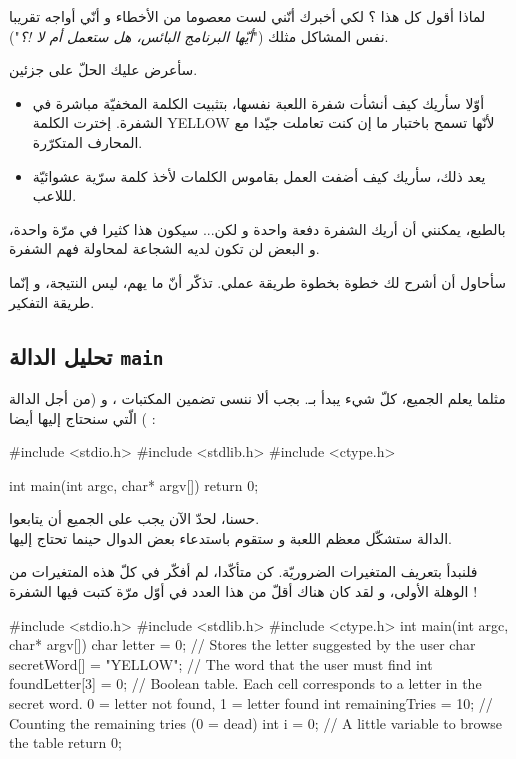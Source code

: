 لماذا أقول كل هذا ؟ لكي أخبرك أنّني لست معصوما من الأخطاء و أنّي أواجه تقريبا نفس المشاكل مثلك
("\textit{أيّها البرنامج البائس، هل ستعمل أم لا !؟}").

سأعرض عليك الحلّ على جزئين.
\begin{itemize}
  \item أوّلا سأريك كيف أنشأت شفرة اللعبة نفسها، بتثبيت الكلمة المخفيّة مباشرة في الشفرة. إخترت الكلمة
\textenglish{YELLOW}
لأنّها تسمح باختبار ما إن كنت تعاملت جيّدا مع المحارف المتكرّرة.
  \item يعد ذلك، سأريك كيف أضفت العمل بقاموس الكلمات لأخذ كلمة سرّية عشوائيّة لللاعب.
\end{itemize}

بالطبع، يمكنني أن أريك الشفرة دفعة واحدة و لكن... سيكون هذا كثيرا في مرّة واحدة، و البعض لن تكون لديه الشجاعة لمحاولة فهم الشفرة.

سأحاول أن أشرح لك خطوة بخطوة طريقة عملي. تذكّر أنّ ما يهم، ليس النتيجة، و إنّما طريقة التفكير.

\subsection{تحليل الدالة
\texttt{main}}
مثلما يعلم الجميع، كلّ شيء يبدأ بـ.
بجب ألا ننسى تضمين المكتبات
،
و
(من أجل الدالة
)
الّتي سنحتاج إليها أيضا :

\begin{Csource}
#include <stdio.h>
#include <stdlib.h>
#include <ctype.h>

int main(int argc, char* argv[])
{
  return 0;
}
\end{Csource}

حسنا، لحدّ الآن يجب على الجميع أن يتابعوا.\\
الدالة
ستشكّل معظم اللعبة و ستقوم باستدعاء بعض الدوال حينما تحتاج إليها.

فلنبدأ بتعريف المتغيرات الضروريّة. كن متأكّدا، لم أفكّر في كلّ هذه المتغيرات من الوهلة الأولى، و لقد كان هناك أقلّ من هذا العدد في أوّل مرّة كتبت فيها الشفرة !

\begin{Csource}
#include <stdio.h>
#include <stdlib.h>
#include <ctype.h>
int main(int argc, char* argv[])
{
  char letter = 0; // Stores the letter suggested by the user
  char secretWord[] = "YELLOW"; // The word that the user must find
  int foundLetter[3] = {0}; // Boolean table. Each cell corresponds to a letter in the secret word. 0 = letter not found, 1 = letter found
  int remainingTries = 10; // Counting the remaining tries (0 = dead)
  int i = 0; // A little variable to browse the table
  return 0;
}
\end{Csource}

